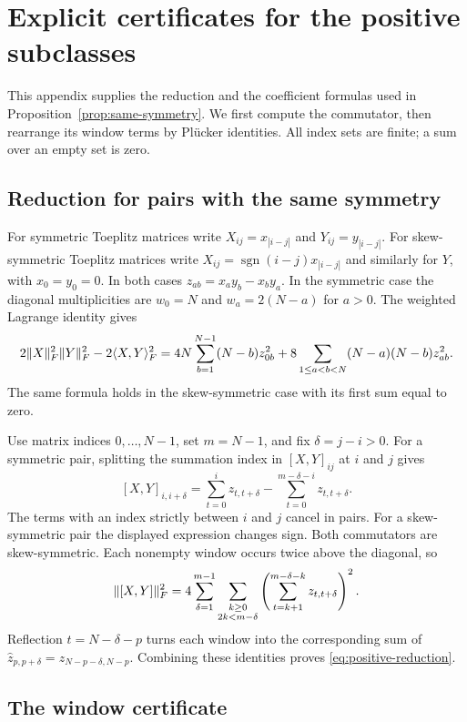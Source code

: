 \section{Explicit certificates for the positive subclasses}
\label{app:positive-certificates}

This appendix supplies the reduction and the coefficient formulas used
in Proposition~\ref{prop:same-symmetry}. We first compute the
commutator, then rearrange its window terms by Pl\"ucker identities.
All index sets are finite; a sum over an empty set is zero.

\subsection{Reduction for pairs with the same symmetry}
\label{app:same-symmetry-reduction}

For symmetric Toeplitz matrices write $X_{ij}=x_{|i-j|}$ and
$Y_{ij}=y_{|i-j|}$. For skew-symmetric Toeplitz matrices write
$X_{ij}=\operatorname{sgn}(i-j)x_{|i-j|}$ and similarly for $Y$,
with $x_0=y_0=0$. In both cases $z_{ab}=x_ay_b-x_by_a$.
In the symmetric case the diagonal multiplicities are $w_0=N$ and
$w_a=2(N-a)$ for $a>0$. The weighted Lagrange identity
\cite[Lemma~10]{laszlo2012} gives
\[
 2\lVert X\rVert_F^2\lVert Y\rVert_F^2-2\langle X,Y\rangle_F^2
 =4N\sum_{b=1}^{N-1}(N-b)z_{0b}^2
   +8\sum_{1\le a<b<N}(N-a)(N-b)z_{ab}^2.
\]
The same formula holds in the skew-symmetric case with its first sum
equal to zero.

Use matrix indices $0,\ldots,N-1$, set $m=N-1$, and fix
$\delta=j-i>0$. For a symmetric pair, splitting the summation index
in $[X,Y]_{ij}$ at $i$ and $j$ gives
\[
 [X,Y]_{i,i+\delta}
 =\sum_{t=0}^{i}z_{t,t+\delta}
  -\sum_{t=0}^{m-\delta-i}z_{t,t+\delta}.
\]
The terms with an index strictly between $i$ and $j$ cancel in pairs.
For a skew-symmetric pair the displayed expression changes sign.
Both commutators are skew-symmetric. Each nonempty window occurs
twice above the diagonal, so
\[
 \lVert[X,Y]\rVert_F^2
 =4\sum_{\delta=1}^{m-1}
   \sum_{\substack{k\ge0\\2k<m-\delta}}
   \left(\sum_{t=k+1}^{m-\delta-k}z_{t,t+\delta}\right)^2.
\]
Reflection $t=N-\delta-p$ turns each window into the corresponding
sum of $\hat z_{p,p+\delta}=z_{N-p-\delta,N-p}$. Combining these
identities proves \eqref{eq:positive-reduction}.

\subsection{The window certificate}\label{app:positive-windows}

